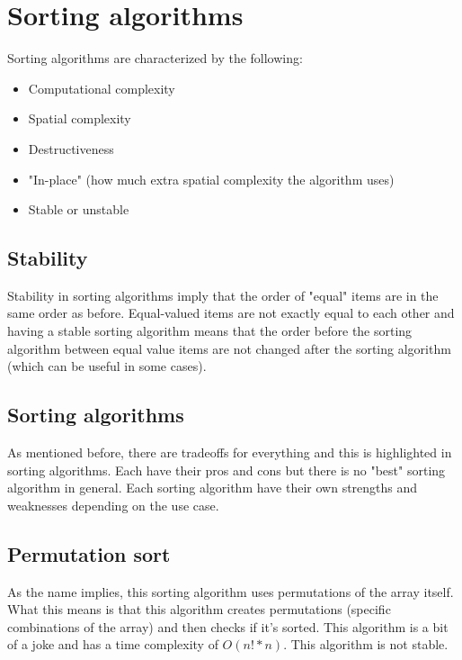 \documentclass[11pt,a4paper,english]{paper}
\begin{document}
\section{Sorting algorithms}

Sorting algorithms are characterized by the following:

\begin{bluebox}{}{
\begin{itemize}

  \item Computational complexity
  \item Spatial complexity
  \item Destructiveness
  \item "In-place" (how much extra spatial complexity the algorithm uses)
  \item Stable or unstable

\end{itemize}
}\end{bluebox}

\subsection{Stability}

Stability in sorting algorithms imply that the order of "equal" items are in the same order as before. Equal-valued items are not exactly equal to each other and having a stable sorting algorithm means that the order before the sorting algorithm between equal value items are not changed after the sorting algorithm (which can be useful in some cases).

\subsection{Sorting algorithms}

As mentioned before, there are tradeoffs for everything and this is highlighted in sorting algorithms. Each have their pros and cons but there is no "best" sorting algorithm in general. Each sorting algorithm have their own strengths and weaknesses depending on the use case.

\subsection{Permutation sort}

As the name implies, this sorting algorithm uses permutations of the array itself. What this means is that this algorithm creates permutations (specific combinations of the array) and then checks if it's sorted. This algorithm is a bit of a joke and has a time complexity of $O(n! * n)$. This algorithm is not stable.
\end{document}
